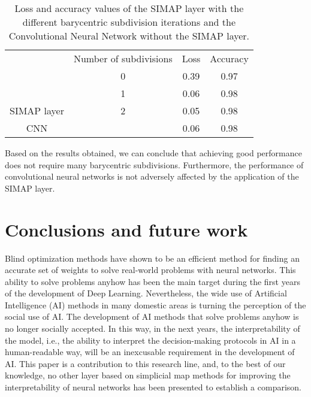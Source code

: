 \begin{table}[ht]
\centering
\caption{Loss and accuracy values of the SIMAP layer with the different 
barycentric subdivision iterations and the Convolutional Neural Network without the SIMAP layer.}
\begin{tabular}{|c|c|c|c|}
\hline
                              & Number of subdivisions                          & Loss & Accuracy \\ \cline{2-4} 
                              & 0                                               & 0.39 & 0.97     \\ \cline{2-4} 
                              & 1                                               & 0.06 & 0.98     \\ \cline{2-4} 
\multirow{-4}{*}{SIMAP layer} & 2                                               & 0.05 & 0.98     \\ \hline
CNN                           & \cellcolor[HTML]{C0C0C0}{\color[HTML]{9B9B9B} } & 0.06 & 0.98     \\ \hline
\end{tabular}
\label{tab:model_performance}
\end{table}

Based on the results obtained, we can conclude that achieving good performance does not require many barycentric subdivisions. Furthermore, the performance of convolutional neural networks is not adversely affected by the application of the SIMAP
layer. 




\section{Conclusions and future work}
Blind optimization methods have shown to be an efficient method for finding an accurate set of weights to solve real-world problems with neural networks. This ability to solve problems anyhow has been the main target during the first years of the development of Deep Learning. Nevertheless, the wide use of Artificial Intelligence (AI) methods in many domestic areas is turning the perception of the social use of AI. The development of AI methods that solve problems anyhow is no longer socially accepted. In this way, in the next years, the interpretability of the model, i.e., the ability to interpret the decision-making protocols in AI in a human-readable way, will be an inexcusable requirement in the development of AI. This paper is a contribution to this research line, and, to the best of our knowledge, no other layer based on simplicial map methods for improving the interpretability of neural networks has been presented to establish a comparison.

